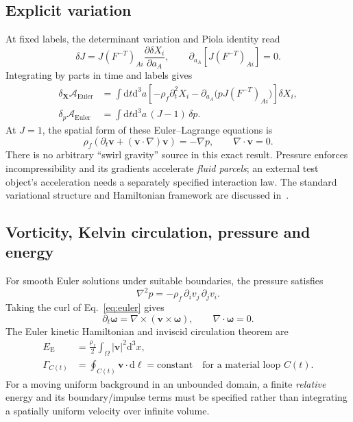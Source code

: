 \documentclass[11pt,a4paper]{article}
\newcommand{\rhoF}{\rho_{\!f}}
\newcommand{\om}{\boldsymbol{\omega}}
\newcommand{\vv}{\mathbf v}
\newcommand{\XX}{\mathbf X}
\newcommand{\dd}{\mathrm d}
\begin{document}
\subsection{Explicit variation}
At fixed labels, the determinant variation and Piola identity read
\begin{equation}
\delta J=J(F^{-T})_{Ai}\frac{\partial\delta X_i}{\partial a_A},\qquad
\partial_{a_A}\!\left[J(F^{-T})_{Ai}\right]=0.
\end{equation}
Integrating by parts in time and labels gives
\begin{align}
\delta_{\XX}\mathcal A_{\mathrm{Euler}}&=\int\!\dd t\dd^3a
\left[-\rhoF\partial_t^2X_i-\partial_{a_A}\big(pJ(F^{-T})_{Ai}\big)\right]\delta X_i,\\
\delta_{p}\mathcal A_{\mathrm{Euler}}&=\int\!\dd t\dd^3a\,(J-1)\,\delta p.
\end{align}
At $J=1$, the spatial form of these Euler--Lagrange equations is
\begin{equation}\label{eq:euler}
\boxed{\qquad \rhoF\left(\partial_t\vv+(\vv\cdot\nabla)\vv\right)=-\nabla p,
\qquad \nabla\cdot\vv=0.\qquad}
\end{equation}
There is no arbitrary ``swirl gravity'' source in this exact result. Pressure enforces incompressibility and its gradients accelerate \emph{fluid parcels}; an external test object's acceleration needs a separately specified interaction law. The standard variational structure and Hamiltonian framework are discussed in~\cite{Salmon1988,Holm1998EP}.

\subsection{Vorticity, Kelvin circulation, pressure and energy}
For smooth Euler solutions under suitable boundaries, the pressure satisfies
\begin{equation}\label{eq:poisson}
\boxed{\qquad \nabla^2p=-\rhoF\,\partial_i v_j\,\partial_jv_i.\qquad}
\end{equation}
Taking the curl of Eq.~\eqref{eq:euler} gives
\begin{equation}\label{eq:omega}
\partial_t\om=\nabla\times(\vv\times\om),\qquad\nabla\cdot\om=0.
\end{equation}
The Euler kinetic Hamiltonian and inviscid circulation theorem are
\begin{align}
E_{\mathrm E}&=\frac{\rhoF}{2}\int_{\Omega}|\vv|^2\dd^3x,\\
\Gamma_{C(t)}&=\oint_{C(t)}\vv\cdot\dd\boldsymbol\ell=\text{constant}
\quad\text{for a material loop $C(t)$.}
\end{align}
For a moving uniform background in an unbounded domain, a finite \emph{relative} energy and its boundary/impulse terms must be specified rather than integrating a spatially uniform velocity over infinite volume.
\end{document}
